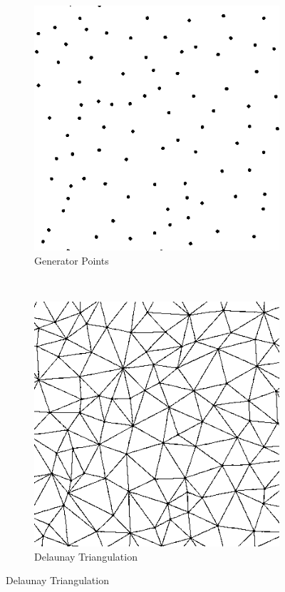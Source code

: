\documentclass[a4paper,11pt]{article}
\begin{document}
\begin{figure}[htp]
\centering
\begin{subfigure}[t]{0.4\textwidth}
  \centering
  \includegraphics[width=\textwidth]{ch3_figs/stoma_pts_square_edited}
  \caption{Generator Points}
\end{subfigure}
~
\begin{subfigure}[t]{0.4\textwidth}
  \centering
  \includegraphics[width=\textwidth]{ch3_figs/d_stoma_square_edited}
  \caption{Delaunay Triangulation}
\end{subfigure}


\end{figure}
\end{document}
